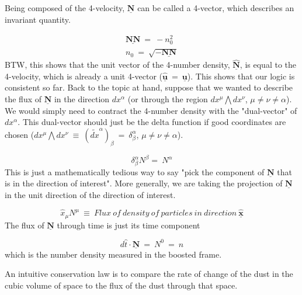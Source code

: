 \hskip 25pt Being composed of the 4-velocity, $\underline{\mathbf{N}}$ can be called a 4-vector, which describes an invariant quantity.

\begin{equation}
  \begin{gathered}
    \underline{\mathbf{NN}}\ =\ -n_0^2 \\
    n_0\ =\ \sqrt{-\underline{\mathbf{NN}}}
  \end{gathered}
\end{equation}
BTW, this shows that the unit vector of the 4-number density, $\widehat{\underline{\mathbf{N}}}$, is equal to the 4-velocity, which is already a unit 4-vector ($\hat{\underline{\mathbf{u}}}\ =\ \underline{\mathbf{u}}$).  This shows that our logic is consistent so far.  Back to the topic at hand, suppose that we wanted to describe the flux of $\underline{\mathbf{N}}$ in the direction $dx^{\alpha}$ (or through the region $dx^{\mu}\bigwedge dx^{\nu}$, $\mu\neq\nu\neq\alpha$).  We would simply need to contract the 4-number density with the "dual-vector" of $dx^{\alpha}$.  This dual-vector should just be the delta function if good coordinates are chosen ($dx^{\mu}\bigwedge dx^{\nu}\ \equiv\ (\tilde{dx}^{\alpha})_{\beta}\ =\ \delta^{\alpha}_{\beta}$, $\mu\neq\nu\neq\alpha$).

\begin{equation}
  \delta^{\alpha}_{\beta}N^{\beta} =\ N^{\alpha}
\end{equation}
This is just a mathematically tedious way to say "pick the component of $\underline{\mathbf{N}}$ that is in the direction of interest".  More generally, we are taking the projection of $\underline{\mathbf{N}}$ in the unit direction of the direction of interest.

\begin{equation}
  \hat{x}_{\mu}N^{\mu}\ \equiv\ \mathit{Flux\ of\ density\ of\ particles\ in\ direction}\ \hat{\underline{\mathbf{x}}}
\end{equation}
The flux of $\underline{\mathbf{N}}$ through time is just its time component

\begin{equation}
  d\hat{t}\cdot\underline{\mathbf{N}}\ =\ N^0\ =\ n
\end{equation}
which is the number density measured in the boosted frame.  

\hskip 25pt  An intuitive conservation law is to compare the rate of change of the dust in the cubic volume of space to the flux of the dust through that space.

